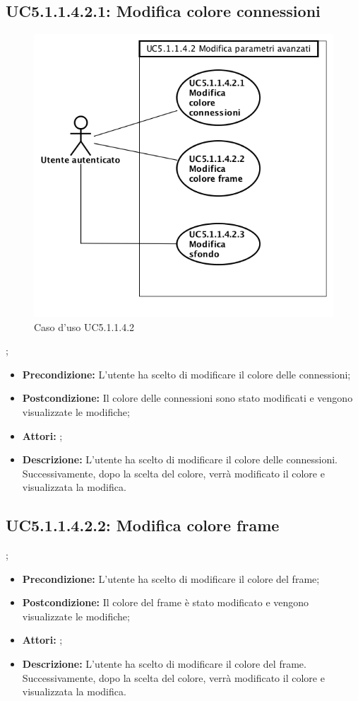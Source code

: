 \subsection{ UC5.1.1.4.2.1: Modifica colore connessioni}

\begin{figure}[h]
	\begin{center}
	\includegraphics[scale=0.4]{diagram/UC5-1-1-4-2.png}
	\caption{Caso d'uso UC5.1.1.4.2}
	\end{center}
\end{figure};
\begin{itemize}
	\item \textbf{Precondizione:} L'utente ha scelto di modificare il colore delle connessioni;
	\item \textbf{Postcondizione:} Il colore delle connessioni sono stato modificati e vengono visualizzate le modifiche;
	\item \textbf{Attori:} ;
	\item \textbf{Descrizione:} L'utente ha scelto di modificare il colore delle connessioni.  Successivamente, dopo la scelta del colore, verrà modificato il colore e visualizzata la modifica.
\end{itemize}
\subsection{ UC5.1.1.4.2.2: Modifica colore frame}
;
\begin{itemize}
	\item \textbf{Precondizione:} L'utente ha scelto di modificare il colore del frame;
	\item \textbf{Postcondizione:} Il colore del frame è stato modificato e vengono visualizzate le modifiche;
	\item \textbf{Attori:} ;
	\item \textbf{Descrizione:} L'utente ha scelto di modificare il colore del frame.  Successivamente, dopo la scelta del colore, verrà modificato il colore e visualizzata la modifica.
\end{itemize}
